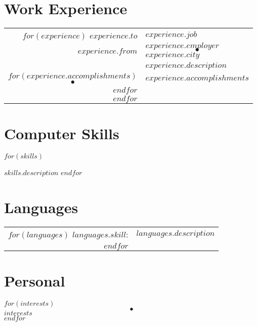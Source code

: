 \documentclass[a4paper,10pt]{article}
\begin{document}
\section{Work Experience}

\begin{tabular}{r|p{14cm}}
$for(experience)$
$experience.to$   & $experience.job$\\
$experience.from$ & \textsc{$experience.employer$}\textcolor{lightcomment}{$$~~\bullet~~$$}\textcolor{comment}{$experience.city$} \\
                  & \footnotesize{\textsf{\textbf{$experience.description$}} }\\
$for(experience.accomplishments)$ 
\textcolor{lightcomment}{$$\bullet$$} & \footnotesize{\textsf{$experience.accomplishments$}}\\
$endfor$
\multicolumn{2}{c}{} \\
$endfor$
\end{tabular}

\section{Computer Skills}
\begin{description}
$for(skills)$
\item[$skills.skill$]\textsf{$skills.description$}
$endfor$
\end{description}


\section{Languages}
\begin{tabular}{rl}
$for(languages)$
\textsc{$languages.skill$:} & $languages.description$\\
$endfor$
\end{tabular}


\section{Personal}
$for(interests)$
\textcolor{lightcomment}{$$~~\bullet~~$$}\textsf{$interests$}\\
$endfor$
\end{document}
